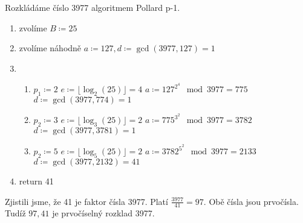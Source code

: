 \documentclass[12pt, a4paper]{article}
\begin{document}
Rozkládáme číslo 3977 algoritmem Pollard p-1.
\begin{enumerate}
\item zvolíme $B \coloneqq 25$
\item zvolíme náhodně $a \coloneqq 127, d \coloneqq \gcd(3977, 127) = 1$
\item 
\begin{enumerate}
\item $p_1 \coloneqq 2$
\subitem $e \coloneqq \lfloor \log_2(25) \rfloor = 4$
\subitem $a \coloneqq 127^{2^4} \mod 3977 = 775$
\subitem $d \coloneqq \gcd(3977, 774) = 1$
\item $p_2 \coloneqq 3$
\subitem $e \coloneqq \lfloor \log_3(25) \rfloor = 2$
\subitem $a \coloneqq 775^{3^2} \mod 3977 = 3782$
\subitem $d \coloneqq \gcd(3977, 3781) = 1$
\item $p_2 \coloneqq 5$
\subitem $e \coloneqq \lfloor \log_5(25) \rfloor = 2$
\subitem $a \coloneqq 3782^{5^2} \mod 3977 = 2133$
\subitem $d \coloneqq \gcd(3977, 2132) = 41$
\end{enumerate}
\item return 41
\end{enumerate}
Zjistili jsme, že 41 je faktor čísla 3977. Platí $\frac{3977}{41} = 97$. Obě čísla jsou prvočísla. Tudíž $97, 41$ je prvočíselný rozklad 3977.
\end{document}
